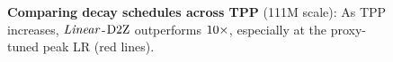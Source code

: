 \begin{figure}
  \vspace{-2mm}
  \centering
  \mbox{}
  \vspace{-4mm}
  \mbox{}
  \caption{\textbf{Comparing decay schedules across TPP} (111M
    scale): As TPP increases, $\mbox{\emph{Linear}}$-$\mbox{D2Z}$ outperforms $\mbox{10}\times$,
    especially at the proxy-tuned peak LR (red lines).
    \label{fig:maxlr_tpp:111M}}
\end{figure}
